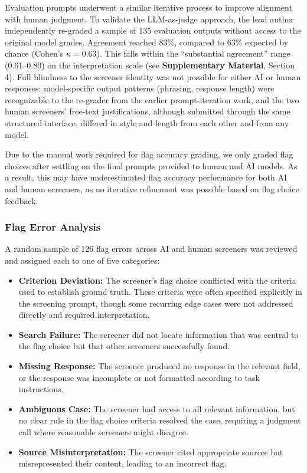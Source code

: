 \documentclass[utf8]{FrontiersinHarvard}
\begin{document}
Evaluation prompts underwent a similar iterative process to improve alignment with human judgment. To validate the LLM-as-judge approach, the lead author independently re-graded a sample of 135 evaluation outputs without access to the original model grades. Agreement reached 83\%, compared to 63\% expected by chance (Cohen's $\kappa = 0.63$). This falls within the ``substantial agreement'' range (0.61--0.80) on the \citet{LandisKoch1977} interpretation scale (see \textbf{Supplementary Material}, Section 4). Full blindness to the screener identity was not possible for either AI or human responses: model-specific output patterns (phrasing, response length) were recognizable to the re-grader from the earlier prompt-iteration work, and the two human screeners' free-text justifications, although submitted through the same structured interface, differed in style and length from each other and from any model.

Due to the manual work required for flag accuracy grading, we only graded flag choices after settling on the final prompts provided to human and AI models. As a result, this may have underestimated flag accuracy performance for both AI and human screeners, as no iterative refinement was possible based on flag choice feedback.

\subsubsection{Flag Error Analysis}

A random sample of 126 flag errors across AI and human screeners was reviewed and assigned each to one of five categories:

\begin{itemize}
\item \textbf{Criterion Deviation:} The screener's flag choice conflicted with the criteria used to establish ground truth. These criteria were often specified explicitly in the screening prompt, though some recurring edge cases were not addressed directly and required interpretation.
\item \textbf{Search Failure:} The screener did not locate information that was central to the flag choice but that other screeners successfully found.
\item \textbf{Missing Response:} The screener produced no response in the relevant field, or the response was incomplete or not formatted according to task instructions.
\item \textbf{Ambiguous Case:} The screener had access to all relevant information, but no clear rule in the flag choice criteria resolved the case, requiring a judgment call where reasonable screeners might disagree.
\item \textbf{Source Misinterpretation:} The screener cited appropriate sources but misrepresented their content, leading to an incorrect flag.
\end{itemize}
\end{document}
